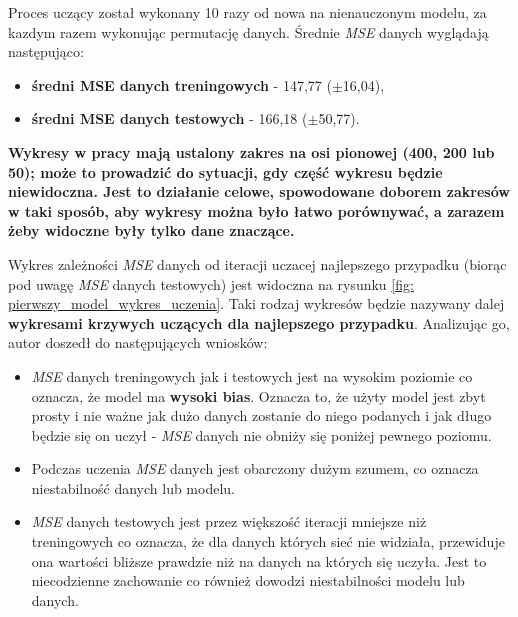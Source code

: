 \documentclass[12pt]{aghdpl}
\begin{document}
		Proces uczący został wykonany 10 razy od nowa na nienauczonym modelu, za kazdym razem wykonując permutację danych. Średnie \textit{MSE} danych wyglądają następująco:
		\begin{itemize}
		\item \textbf{średni MSE danych treningowych} - 147,77 ($\pm$16,04),
		\item \textbf{średni MSE danych testowych} - 166,18 ($\pm$50,77).
		\end{itemize}
		
		\textbf{Wykresy w pracy mają ustalony zakres na osi pionowej (400, 200 lub 50); może to prowadzić do sytuacji, gdy część wykresu będzie niewidoczna. Jest to działanie celowe, spowodowane doborem zakresów w taki sposób, aby wykresy można było łatwo porównywać, a zarazem żeby widoczne były tylko dane znaczące.}
		
		Wykres zależności \textit{MSE} danych od iteracji uczacej najlepszego przypadku (biorąc pod uwagę \textit{MSE} danych testowych) jest widoczna na rysunku \ref{fig: pierwszy_model_wykres_uczenia}. Taki rodzaj wykresów będzie nazywany dalej \textbf{wykresami krzywych uczących dla najlepszego przypadku}. Analizując go, autor doszedł do następujących wniosków:
		\begin{itemize}
		\item \textit{MSE} danych treningowych jak i testowych jest na wysokim poziomie co oznacza, że model ma \textbf{wysoki bias}. Oznacza to, że użyty model jest zbyt prosty i nie ważne jak dużo danych zostanie do niego podanych i jak długo będzie się on uczył - \textit{MSE} danych nie obniży się poniżej pewnego poziomu.
		\item Podczas uczenia \textit{MSE} danych jest obarczony dużym szumem, co oznacza niestabilność danych lub modelu.
		\item \textit{MSE} danych testowych jest przez większość iteracji mniejsze niż treningowych co oznacza, że dla danych których sieć nie widziała, przewiduje ona wartości bliższe prawdzie niż na danych na których się uczyła. Jest to niecodzienne zachowanie co również dowodzi niestabilności modelu lub danych.
		\end{itemize}
		
\end{document}
